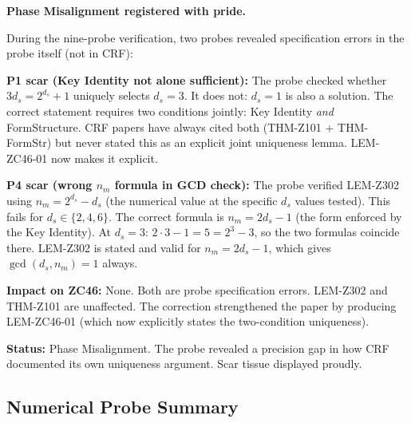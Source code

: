 \documentclass[12pt, a4paper]{article}
\begin{document}
\begin{openqbox}[title={PM-ZC46-01: Two Probe Specification
  Errors (Scar Tissue)}]

\textbf{Phase Misalignment registered with pride.}

During the nine-probe verification, two probes revealed
specification errors in the probe itself (not in CRF):

\medskip
\textbf{P1 scar (Key Identity not alone sufficient):}
The probe checked whether $3d_s = 2^{d_s}+1$ uniquely selects
$d_s = 3$. It does not: $d_s = 1$ is also a solution.
The correct statement requires two conditions jointly:
Key Identity \emph{and} FormStructure.
CRF papers have always cited both (THM-Z101 + THM-FormStr)
but never stated this as an explicit joint uniqueness lemma.
LEM-ZC46-01 now makes it explicit.

\medskip
\textbf{P4 scar (wrong $n_m$ formula in GCD check):}
The probe verified LEM-Z302 using $n_m = 2^{d_s} - d_s$ (the
numerical value at the specific $d_s$ values tested). This fails
for $d_s \in \{2, 4, 6\}$. The correct formula is $n_m = 2d_s - 1$
(the form enforced by the Key Identity). At $d_s = 3$:
$2\cdot 3 - 1 = 5 = 2^3 - 3$, so the two formulas coincide there.
LEM-Z302 is stated and valid for $n_m = 2d_s - 1$, which gives
$\gcd(d_s, n_m) = 1$ always.

\medskip
\textbf{Impact on ZC46:} None. Both are probe specification
errors. LEM-Z302 and THM-Z101 are unaffected. The correction
strengthened the paper by producing LEM-ZC46-01 (which now
explicitly states the two-condition uniqueness).

\textbf{Status:} Phase Misalignment. The probe revealed a
precision gap in how CRF documented its own uniqueness argument.
Scar tissue displayed proudly.
\end{openqbox}

\subsection{Numerical Probe Summary}

\end{document}
